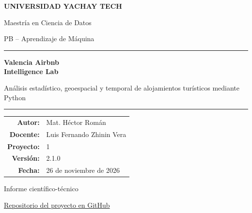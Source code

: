 \documentclass[11pt,a4paper]{article}
\begin{document}

\hypersetup{pageanchor=false}
\begin{titlepage}

\centering

{\Large\bfseries\color{academicblue}
UNIVERSIDAD YACHAY TECH\par}

\vspace{0.5cm}

{\large Maestría en Ciencia de Datos\par}

\vspace{0.3cm}

{\large PB -- Aprendizaje de Máquina\par}

\vfill

{\color{academicblue}\rule{\textwidth}{1.5pt}}

\vspace{0.7cm}

{\Huge\bfseries\color{academicblue}
Valencia Airbnb\\[0.3cm]
Intelligence Lab\par}

\vspace{0.6cm}

{\Large
Análisis estadístico, geoespacial y temporal
de alojamientos turísticos mediante Python\par}

\vspace{0.7cm}

{\color{academicblue}\rule{\textwidth}{1.5pt}}

\vfill

{\large
\begin{tabular}{rl}
\textbf{Autor:} & Mat. Héctor Román\\[0.3cm]
\textbf{Docente:} & Luis Fernando Zhinin Vera\\[0.3cm]
\textbf{Proyecto:} & 1\\[0.3cm]
\textbf{Versión:} & 2.1.0\\[0.3cm]
\textbf{Fecha:} & 26 de noviembre de 2026
\end{tabular}
}

\vfill

{\large
Informe científico-técnico\par}

\vspace{0.5cm}

\href{
https://github.com/alexroma1126-design/valencia-airbnb-intelligence-lab
}{Repositorio del proyecto en GitHub}

\end{titlepage}
\hypersetup{pageanchor=true}
\end{document}
